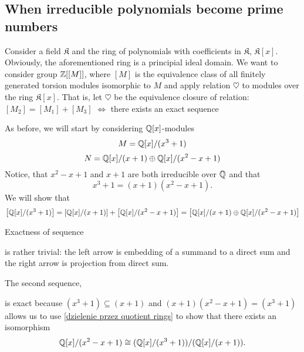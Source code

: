 \subsection{When irreducible polynomials become prime numbers}

Consider a field $\mathfrak{K}$ and the ring of polynomials with coefficients in $\mathfrak{K}$, $\mathfrak{K}[x]$. Obviously, the aforementioned ring is a principial ideal domain. We want to consider group $\operatorname{\mathbb{Z}}[[M]]$, where $[M]$ is the equivalence class of all finitely generated torsion modules isomorphic to $M$ and apply relation $\heartsuit$ to modules over the ring $\mathfrak{K}[x]$. That is, let $\heartsuit$ be the equivalence closure of relation: $[M_2]=[M_1]+[M_3]$ $\iff$ there exists an exact sequence
\begin{center}\end{center}

\begin{example} As before, we will start by considering $\operatorname{\mathbb{Q}}[x]$-modules
  $$M={\operatorname{\mathbb{Q}}[x]}/{(x^3+1)}$$
  $$N={\operatorname{\mathbb{Q}}[x]}/{(x+1)}\oplus{\operatorname{\mathbb{Q}}[x]}/{(x^2-x+1)}$$
  Notice, that $x^2-x+1$ and $x+1$ are both irreducible over $\operatorname{\mathbb{Q}}$ and that 
  $$x^3+1=(x+1)(x^2-x+1).$$
  We will show that
  $$\left[{\operatorname{\mathbb{Q}}[x]}/{(x^3+1)}\right]=\left[{\operatorname{\mathbb{Q}}[x]}/{(x+1)}\right]+\left[{\operatorname{\mathbb{Q}}[x]}/{(x^2-x+1)}\right]=\left[{\operatorname{\mathbb{Q}}[x]}/{(x+1)}\oplus{\operatorname{\mathbb{Q}}[x]}/{(x^2-x+1)}\right]$$

  Exactness of sequence
  \begin{center}\end{center}
  is rather trivial: the left arrow is embedding of a summand to a direct sum and the right arrow is projection from direct sum.

  The second sequence,
  \begin{center}\end{center}
  is exact because $(x^3+1)\subseteq (x+1)$ and $(x+1)(x^2-x+1)=(x^3+1)$ allows us to use \cref{dzielenie przez quotient rings} to show that there exists an isomorphism
  $$\operatorname{\mathbb{Q}}[x]/(x^2-x+1)\cong (\operatorname{\mathbb{Q}}[x]/(x^3+1))/(\operatorname{\mathbb{Q}}[x]/(x+1)).$$
\end{example}

